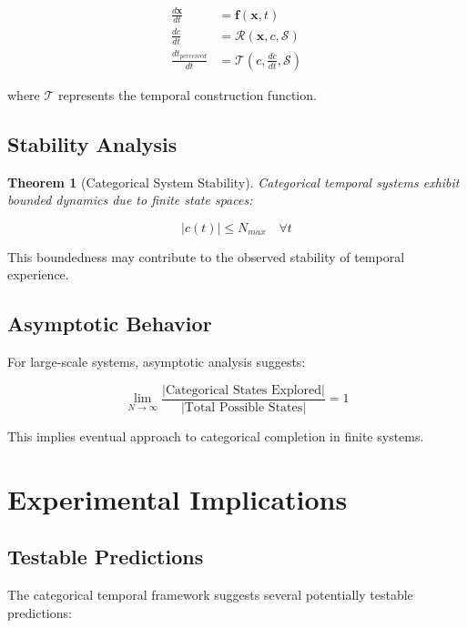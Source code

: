 \documentclass[12pt,a4paper]{article}
\newtheorem{theorem}{Theorem}[section]
\theoremstyle{remark}
\begin{document}
\begin{align}
\frac{d\mathbf{x}}{dt} &= \mathbf{f}(\mathbf{x}, t) \\
\frac{dc}{dt} &= \mathcal{R}(\mathbf{x}, c, \mathcal{S}) \\
\frac{dt_{perceived}}{dt} &= \mathcal{T}(c, \frac{dc}{dt}, \mathcal{S})
\end{align}

where $\mathcal{T}$ represents the temporal construction function.

\subsection{Stability Analysis}

\begin{theorem}[Categorical System Stability]
Categorical temporal systems exhibit bounded dynamics due to finite state spaces:

\begin{equation}
|c(t)| \leq N_{max} \quad \forall t
\end{equation}
\end{theorem}

This boundedness may contribute to the observed stability of temporal experience.

\subsection{Asymptotic Behavior}

For large-scale systems, asymptotic analysis suggests:

\begin{equation}
\lim_{N \to \infty} \frac{|\text{Categorical States Explored}|}{|\text{Total Possible States}|} = 1
\end{equation}

This implies eventual approach to categorical completion in finite systems.

\section{Experimental Implications}

\subsection{Testable Predictions}

The categorical temporal framework suggests several potentially testable predictions:
\end{document}
